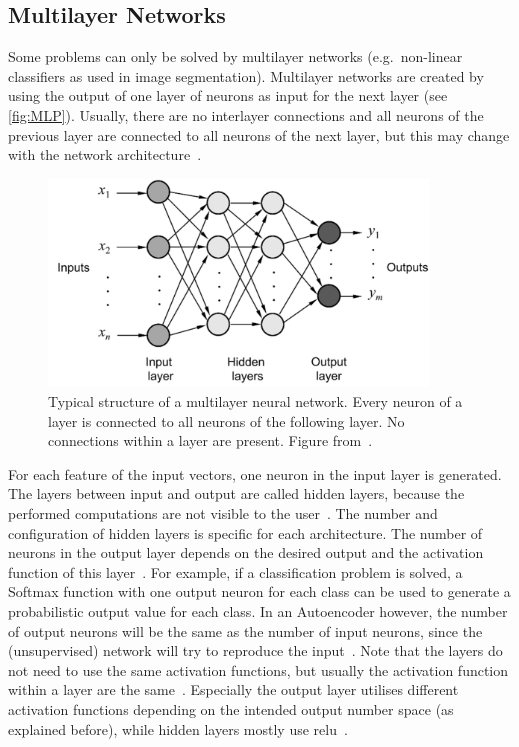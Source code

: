 \subsection{Multilayer Networks}
Some problems can only be solved by multilayer networks (e.g.~non-linear classifiers as used in image segmentation).
Multilayer networks are created by using the output of one layer of neurons as input for the next layer (see \autoref{fig:MLP}).
Usually, there are no interlayer connections and all neurons of the previous layer are connected to all neurons of the next layer, but this may change with the network architecture~\autocite[Chapter~1.2.2]{Aggarwal2018}.
\begin{figure}[!htb]
    \centering
    \includegraphics[width=0.9\textwidth]{pictures/MLP}
    \caption[Typical structure of multilayer neural networks]{Typical structure of a multilayer neural network. Every neuron of a layer is connected to all neurons of the following layer. No connections within a layer are present. Figure from~\autocite{Pouliakis2016}.}
    \label{fig:MLP}
\end{figure}

For each feature of the input vectors, one neuron in the input layer is generated.
The layers between input and output are called hidden layers, because the performed computations are not visible to the user~\autocite[Chapter~1.2.2]{Aggarwal2018}.
The number and configuration of hidden layers is specific for each architecture.
The number of neurons in the output layer depends on the desired output and the activation function of this layer~\autocite[Chapter~1.2.1]{Aggarwal2018}.
For example, if a classification problem is solved, a Softmax function with one output neuron for each class can be used to generate a probabilistic output value for each class.
In an Autoencoder however, the number of output neurons will be the same as the number of input neurons, since the (unsupervised) network will try to reproduce the input~\autocite{Aggarwal2018}.
Note that the layers do not need to use the same activation functions, but usually the activation function within a layer are the same~\autocite[Chapter~1.2]{Aggarwal2018}.
Especially the output layer utilises different activation functions depending on the intended output number space (as explained before), while hidden layers mostly use \gls{relu}~\autocite{Johnson2020}.


